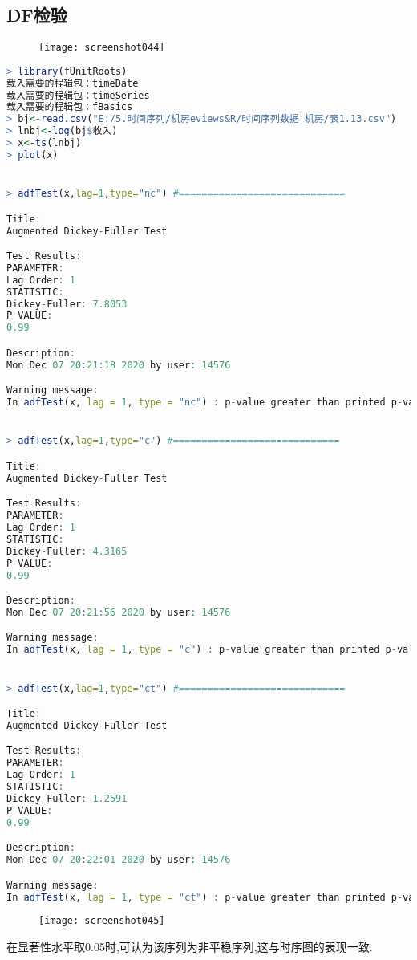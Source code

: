 \documentclass[11pt,a4paper,oneside]{book}
\begin{document}
\subsection{DF检验}
\begin{figure}[H]
	\texttt{[image: screenshot044]}
	\label{fig:screenshot044}
\end{figure}

\begin{lstlisting}[language=r]
> library(fUnitRoots)
载入需要的程辑包：timeDate
载入需要的程辑包：timeSeries
载入需要的程辑包：fBasics
> bj<-read.csv("E:/5.时间序列/机房eviews&R/时间序列数据_机房/表1.13.csv")
> lnbj<-log(bj$收入)
> x<-ts(lnbj)
> plot(x)


> adfTest(x,lag=1,type="nc") #=============================

Title:
Augmented Dickey-Fuller Test

Test Results:
PARAMETER:
Lag Order: 1
STATISTIC:
Dickey-Fuller: 7.8053
P VALUE:
0.99 

Description:
Mon Dec 07 20:21:18 2020 by user: 14576

Warning message:
In adfTest(x, lag = 1, type = "nc") : p-value greater than printed p-value


> adfTest(x,lag=1,type="c") #=============================

Title:
Augmented Dickey-Fuller Test

Test Results:
PARAMETER:
Lag Order: 1
STATISTIC:
Dickey-Fuller: 4.3165
P VALUE:
0.99 

Description:
Mon Dec 07 20:21:56 2020 by user: 14576

Warning message:
In adfTest(x, lag = 1, type = "c") : p-value greater than printed p-value


> adfTest(x,lag=1,type="ct") #=============================

Title:
Augmented Dickey-Fuller Test

Test Results:
PARAMETER:
Lag Order: 1
STATISTIC:
Dickey-Fuller: 1.2591
P VALUE:
0.99 

Description:
Mon Dec 07 20:22:01 2020 by user: 14576

Warning message:
In adfTest(x, lag = 1, type = "ct") : p-value greater than printed p-value
\end{lstlisting}
\begin{figure}[H]
	\texttt{[image: screenshot045]}
	\label{fig:screenshot045}
\end{figure}
在显著性水平取0.05时,可认为该序列为非平稳序列,这与时序图的表现一致.
\end{document}
